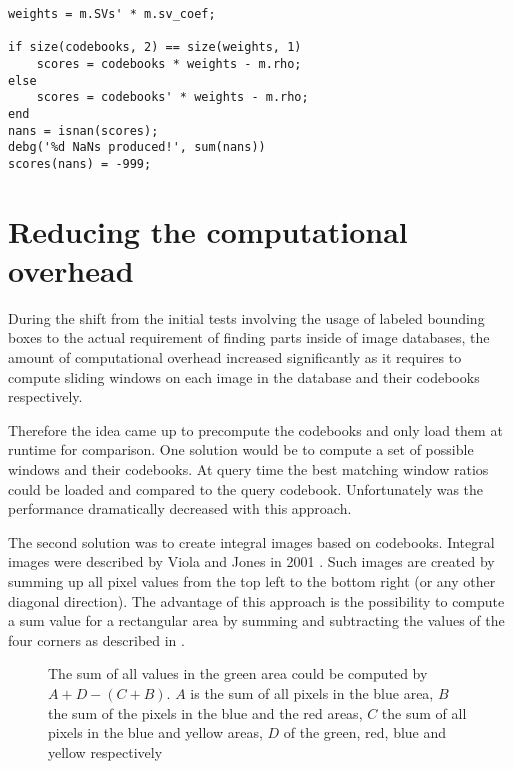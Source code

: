 \begin{lstlisting}[caption={\MATLAB variant of svmpredict},label=lst:matlab_svm_predict]
weights = m.SVs' * m.sv_coef;

if size(codebooks, 2) == size(weights, 1)
    scores = codebooks * weights - m.rho;
else
    scores = codebooks' * weights - m.rho;
end
nans = isnan(scores);
debg('%d NaNs produced!', sum(nans))
scores(nans) = -999;
\end{lstlisting}

\section{Reducing the computational overhead}

During the shift from the initial tests involving the usage of labeled bounding boxes to the actual requirement of finding parts inside of image databases, the amount of computational overhead increased significantly as it requires to compute sliding windows on each image in the database and their codebooks respectively.

Therefore the idea came up to precompute the codebooks and only load them at runtime for comparison. One solution would be to compute a set of possible windows and their codebooks. At query time the best matching window ratios could be loaded and compared to the query codebook. Unfortunately was the performance dramatically decreased with this approach.

The second solution was to create integral images based on codebooks. Integral images were described by Viola and Jones in 2001 \cite{viola2001rapid}. Such images are created by summing up all pixel values from the top left to the bottom right (or any other diagonal direction). The advantage of this approach is the possibility to compute a sum value for a rectangular area by summing and subtracting the values of the four corners as described in . 

\begin{figure}
\caption[Sum of area in integral image]{The sum of all values in the green area could be computed by $A+D-(C+B)$. $A$ is the sum of all pixels in the blue area, $B$ the sum of the pixels in the blue and the red areas, $C$ the sum of all pixels in the blue and yellow areas, $D$ of the green, red, blue and yellow respectively}
\label{fig:integral_image}
\end{figure}

